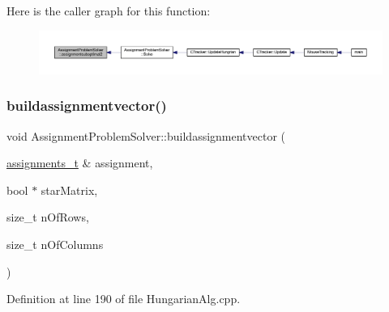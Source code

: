Here is the caller graph for this function\+:\nopagebreak
\begin{figure}[H]
\begin{center}
\leavevmode
\includegraphics[width=350pt]{class_assignment_problem_solver_a31277dc88cb22e07db1e52b6fe88f84f_icgraph}
\end{center}
\end{figure}
\mbox{\label{class_assignment_problem_solver_a1aa1c05dec6aef723f5d41affc667a77}} 
\subsubsection{\texorpdfstring{buildassignmentvector()}{buildassignmentvector()}}
{\footnotesize\ttfamily void Assignment\+Problem\+Solver\+::buildassignmentvector (\begin{DoxyParamCaption}\item[{\mbox{\hyperlink{_hungarian_alg_8h_ad7b9f569a9adbd958c668a36b6884ffd}{assignments\+\_\+t}} \&}]{assignment,  }\item[{bool $\ast$}]{star\+Matrix,  }\item[{size\+\_\+t}]{n\+Of\+Rows,  }\item[{size\+\_\+t}]{n\+Of\+Columns }\end{DoxyParamCaption})\hspace{0.3cm}{\ttfamily [private]}}



Definition at line 190 of file Hungarian\+Alg.\+cpp.


